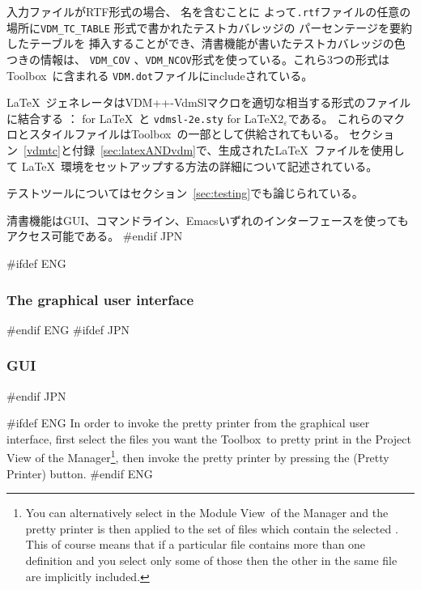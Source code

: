 \documentclass[\pformat,12pt]{article}
\newcommand{\Toolbox}{Toolbox}
\newcommand{\vdmModView}{\guicmd{Module View}}
\newcommand{\vdmModView}{\guicmd{モジュールビュー}}
\newcommand{\Toolbox}{Toolbox}
\newcommand{\vdmModView}{\guicmd{VDM View}}
\newcommand{\vdmModView}{\guicmd{VDMビュー}}
\newcommand{\guicmd}[1]{{\sf #1}}
\newcommand{\guicmd}[1]{{\gt #1}}
\begin{document}
入力ファイルがRTF形式の場合、 名を含むことに
よって{\tt .rtf}ファイルの任意の場所に\texttt{VDM\_TC\_TABLE} 形式で書かれたテストカバレッジの
パーセンテージを要約したテーブルを
挿入することができ、清書機能が書いたテストカバレッジの色つきの情報は、
 \texttt{VDM\_COV}  、\texttt{VDM\_NCOV}形式を使っている。これら3つの形式は\Toolbox\ に含まれる
{\tt VDM.dot}ファイルにincludeされている。

\LaTeX\ ジェネレータはVDM++-VdmSlマクロを適切な相当する形式のファイルに結合する
： for \LaTeX\ と 
{\tt vdmsl-2e.sty} for \LaTeX$2_{\varepsilon}$である。
これらのマクロとスタイルファイルは\Toolbox\ の一部として供給されてもいる。
セクション~\ref{vdmtc}と付録~\ref{sec:latexANDvdm}で、生成された\LaTeX\ ファイルを使用して
\LaTeX\ 環境をセットアップする方法の詳細について記述されている。

テストツールについてはセクション~\ref{sec:testing}でも論じられている。

清書機能はGUI、コマンドライン、Emacsいずれのインターフェースを使ってもアクセス可能である。
#endif JPN

#ifdef ENG
\subsubsection{The graphical user interface}
#endif ENG
#ifdef JPN
\subsubsection{GUI}
#endif JPN

#ifdef ENG
In order to invoke the pretty printer from the graphical user
interface, first select the files you want the \Toolbox\ to pretty
print in the \guicmd{Project View} of the
\guicmd{Manager}\footnote{You can alternatively select
   in the 
  \vdmModView\ of the \guicmd{Manager} and the pretty printer is
  then applied to the set of files which contain the selected
  . This of course means
  that if a particular file contains 
  more than one  definition and you
  select only some of those 
  then the other  in the
  same file are implicitly included.}, then 
invoke the pretty printer by  pressing the  
(\guicmd{Pretty Printer}) button.
#endif ENG
\end{document}
